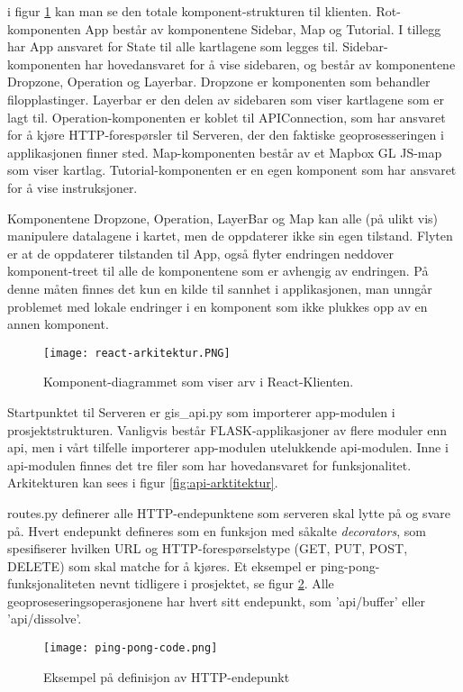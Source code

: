 i figur \ref{fig:react-arkitektur} kan man se den totale komponent-strukturen til klienten. Rot-komponenten App består av komponentene Sidebar, Map og Tutorial. I tillegg har App ansvaret for State til alle kartlagene som legges til. Sidebar-komponenten har hovedansvaret for å vise sidebaren, og består av komponentene Dropzone, Operation og Layerbar. Dropzone er komponenten som behandler filopplastinger. Layerbar er den delen av sidebaren som viser kartlagene som er lagt til. Operation-komponenten er koblet til APIConnection, som har ansvaret for å kjøre HTTP-forespørsler til Serveren, der den faktiske geoprosesseringen i applikasjonen finner sted. Map-komponenten består av et Mapbox GL JS-map som viser kartlag. Tutorial-komponenten er en egen komponent som har ansvaret for å vise instruksjoner.

Komponentene Dropzone, Operation, LayerBar og Map kan alle (på ulikt vis) manipulere datalagene i kartet, men de oppdaterer ikke sin egen tilstand. Flyten er at de oppdaterer tilstanden til App, også flyter endringen neddover komponent-treet til alle de komponentene som er avhengig av endringen. På denne måten finnes det kun en kilde til sannhet i applikasjonen, man unngår problemet med lokale endringer i en komponent som ikke plukkes opp av en annen komponent.

\begin{figure}[h]
    \center
    \texttt{[image: react-arkitektur.PNG]}
    \caption{Komponent-diagrammet som viser arv i React-Klienten.}
    \label{fig:react-arkitektur}
\end{figure}

Startpunktet til Serveren er gis\_api.py som importerer app-modulen i prosjektstrukturen. Vanligvis består FLASK-applikasjoner av flere moduler enn api, men i vårt tilfelle importerer app-modulen utelukkende api-modulen. Inne i api-modulen finnes det tre filer som har hovedansvaret for funksjonalitet. Arkitekturen kan sees i figur \ref{fig:api-arktitektur}.

routes.py definerer alle HTTP-endepunktene som serveren skal lytte på og svare på. Hvert endepunkt defineres som en funksjon med såkalte \textit{decorators}, som spesifiserer hvilken URL og HTTP-forespørselstype (GET, PUT, POST, DELETE) som skal matche for å kjøres. Et eksempel er ping-pong-funksjonaliteten nevnt tidligere i prosjektet, se figur \ref{fig:ping-pong}. Alle geoproseseringsoperasjonene har hvert sitt endepunkt, som 'api/buffer' eller 'api/dissolve'.

\begin{figure}[h]
    \center
    \texttt{[image: ping-pong-code.png]}
    \caption{Eksempel på definisjon av HTTP-endepunkt}
    \label{fig:ping-pong}
\end{figure}



